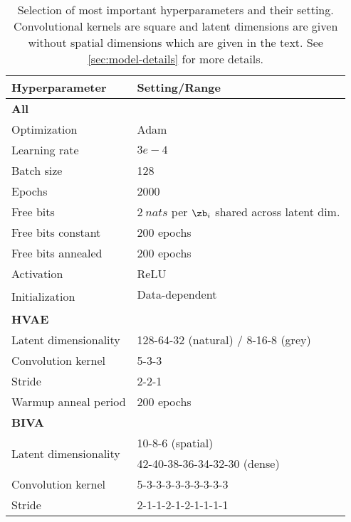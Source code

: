 {\begin{table}[h]
    \centering
    \begin{tabular}{ll}
        \toprule
        Hyperparameter & Setting/Range \\
        \midrule
        \multicolumn{2}{l}{\textbf{All}} \\
        \midrule
        Optimization & Adam \cite{kingma_adam_2015} \\
        Learning rate & $3e-4$ \\
        Batch size & 128 \\
        Epochs & 2000 \\
        Free bits & $\SI{2}{nats}$ per $\zb_i$ shared across latent dim. \\
        Free bits constant & 200 epochs \\
        Free bits annealed & 200 epochs \\
        Activation & ReLU \\
        \multirow{2}{*}{Initialization} & Data-dependent \\
        & \cite{salimans_weight_2016} \\
        \midrule
        \multicolumn{2}{l}{\textbf{HVAE}} \\
        Latent dimensionality & 128-64-32 (natural) / 8-16-8 (grey) \\
        Convolution kernel & 5-3-3 \\
        Stride & 2-2-1 \\
        Warmup anneal period & 200 epochs \\
        \midrule
        \multicolumn{2}{l}{\textbf{BIVA}} \\
        \multirow{2}{*}{Latent dimensionality} & 10-8-6 (spatial) \\
        & 42-40-38-36-34-32-30 (dense) \\
        Convolution kernel & 5-3-3-3-3-3-3-3-3-3 \\
        Stride & {2-1-1-2-1-2-1-1-1-1} \\
        \bottomrule
    \end{tabular}
    \caption[Selection of most important hyperparameters]{Selection of most important hyperparameters and their setting. Convolutional kernels are square and latent dimensions are given without spatial dimensions which are given in the text. See \cref{sec:model-details} for more details.}
    \label{tab_hierarchical:hyperparameters}
\end{table}


}
